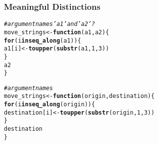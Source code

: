\documentclass[12pt]{beamer}\usepackage[]{graphicx}\usepackage[]{color}
\makeatletter
\newcommand{\hlnum}[1]{\textcolor[rgb]{0.686,0.059,0.569}{#1}}%
\newcommand{\hlcom}[1]{\textcolor[rgb]{0.678,0.584,0.686}{\textit{#1}}}%
\newcommand{\hlstd}[1]{\textcolor[rgb]{0.345,0.345,0.345}{#1}}%
\newcommand{\hlkwa}[1]{\textcolor[rgb]{0.161,0.373,0.58}{\textbf{#1}}}%
\newcommand{\hlkwb}[1]{\textcolor[rgb]{0.69,0.353,0.396}{#1}}%
\newcommand{\hlkwc}[1]{\textcolor[rgb]{0.333,0.667,0.333}{#1}}%
\newcommand{\hlkwd}[1]{\textcolor[rgb]{0.737,0.353,0.396}{\textbf{#1}}}%
\newenvironment{kframe}{%
 \def\at@end@of@kframe{}%
 \ifinner\ifhmode%
  \def\at@end@of@kframe{\end{minipage}}%
  \begin{minipage}{\columnwidth}%
 \fi\fi%
 \def\FrameCommand##1{\hskip\@totalleftmargin \hskip-\fboxsep
 \colorbox{shadecolor}{##1}\hskip-\fboxsep
     \hskip-\linewidth \hskip-\@totalleftmargin \hskip\columnwidth}%
 \MakeFramed {\advance\hsize-\width
   \@totalleftmargin\z@ \linewidth\hsize
   \@setminipage}}%
 {\par\unskip\endMakeFramed%
 \at@end@of@kframe}
\newenvironment{knitrout}{}{} %
\makeatother
\begin{document}

\begin{frame}[fragile]
\frametitle{Meaningful Distinctions}

\begin{knitrout}\footnotesize
{}\color{fgcolor}\begin{kframe}
\begin{alltt}
\hlcom{# argument names 'a1' and 'a2'?}
\hlstd{move_strings} \hlkwb{<-} \hlkwa{function}\hlstd{(}\hlkwc{a1}\hlstd{,} \hlkwc{a2}\hlstd{) \{}
  \hlkwa{for} \hlstd{(i} \hlkwa{in} \hlkwd{seq_along}\hlstd{(a1)) \{}
    \hlstd{a1[i]} \hlkwb{<-} \hlkwd{toupper}\hlstd{(}\hlkwd{substr}\hlstd{(a1,} \hlnum{1}\hlstd{,} \hlnum{3}\hlstd{))}
  \hlstd{\}}
  \hlstd{a2}
\hlstd{\}}
\end{alltt}
\end{kframe}
\end{knitrout}

\pause
\begin{knitrout}\footnotesize
{}\color{fgcolor}\begin{kframe}
\begin{alltt}
\hlcom{# argument names }
\hlstd{move_strings} \hlkwb{<-} \hlkwa{function}\hlstd{(}\hlkwc{origin}\hlstd{,} \hlkwc{destination}\hlstd{) \{}
  \hlkwa{for} \hlstd{(i} \hlkwa{in} \hlkwd{seq_along}\hlstd{(origin)) \{}
    \hlstd{destination[i]} \hlkwb{<-} \hlkwd{toupper}\hlstd{(}\hlkwd{substr}\hlstd{(origin,} \hlnum{1}\hlstd{,} \hlnum{3}\hlstd{))}
  \hlstd{\}}
  \hlstd{destination}
\hlstd{\}}
\end{alltt}
\end{kframe}
\end{knitrout}

\end{frame}

\end{document}
